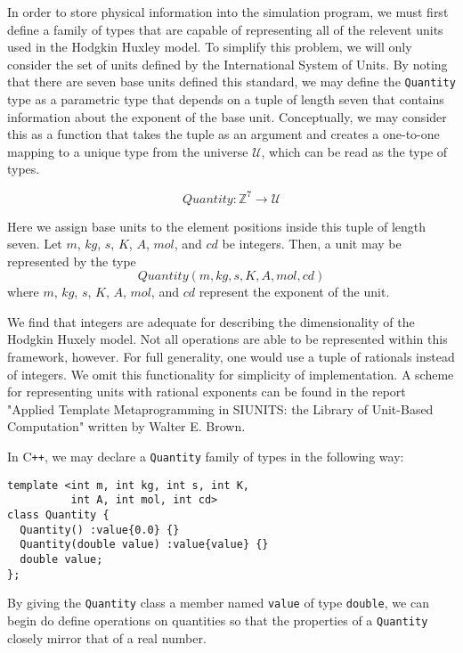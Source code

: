 \documentclass[reprint]{revtex4-1}
\begin{document}
In order to store physical information into the simulation program, we must first define a family of types
that are capable of representing all of the relevent units used in the Hodgkin Huxley model. To simplify this
problem, we will only consider the set of units defined by the International System of Units. By noting that
there are seven base units defined this standard, we may define the \verb|Quantity| type as a parametric type
that depends on a tuple of length seven that contains information about the exponent of the base unit.
Conceptually, we may consider this as a function that takes the tuple as an argument and creates a one-to-one
mapping to a unique type from the universe $\mathscr{U}$, which can be read as the type of types.

\begin{equation*}
  Quantity : \mathbb{Z}^7 \to \mathscr{U}
\end{equation*}

Here we assign base units to the element positions inside this tuple of length seven.
Let $m$, $kg$, $s$, $K$, $A$, $mol$, and $cd$ be integers. Then, a unit may be represented by the type 
\begin{equation*}
  Quantity\left(m, kg,  s,  K,  A,  mol,  cd \right)
\end{equation*}
where $m$, $kg$, $s$, $K$, $A$, $mol$, and $cd$ represent the exponent of the unit.

We find that integers are adequate for describing the dimensionality of the Hodgkin Huxely model. Not all
operations are able to be represented within this framework, however. For full generality, one would use a tuple
of rationals instead of integers. We omit this functionality for simplicity of implementation. A scheme for
representing units with rational exponents can be found in the report "Applied Template Metaprogramming in
SIUNITS: the Library of Unit-Based Computation" written by Walter E. Brown.

In C\verb!++!, we may declare a \verb|Quantity| family of types in the following way:

\begin{verbatim}
template <int m, int kg, int s, int K,
          int A, int mol, int cd>
class Quantity {
  Quantity() :value{0.0} {}
  Quantity(double value) :value{value} {}
  double value;
};
\end{verbatim}

By giving the \verb|Quantity| class a member named \verb|value| of type \verb|double|, we can
begin do define operations on quantities so that the properties of a \verb|Quantity| closely mirror that of
a real number.
\end{document}
